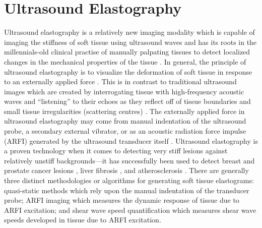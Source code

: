 	\section{Ultrasound Elastography}
		Ultrasound elastography is a relatively new imaging modality which is capable of imaging the stiffness of soft tissue using ultrasound waves \cite{greenleaf03} and has its roots in the millennials-old clinical practise of manually palpating tissues to detect localized changes in the mechanical properties of the tissue \cite{adams02}. In general, the principle of ultrasound elastography is to visualize the deformation of soft tissue in response to an externally applied force \cite{brusseau00}. This is in contrast to traditional ultrasound images which are created by interrogating tissue with high-frequency acoustic waves and ``listening'' to their echoes as they reflect off of tissue boundaries and small tissue irregularities (scattering centres) \cite{hoskins10}. The externally applied force in ultrasound elastography may come from manual indentation of the ultrasound probe, a secondary external vibrator, or as an acoustic radiation force impulse (ARFI) generated by the ultrasound transducer itself \cite{greenleaf03}. Ultrasound elastography is a proven technology when it comes to detecting very stiff lesions against relatively unstiff backgrounds---it has successfully been used to detect breast and prostate cancer lesions \cite{tanter08,konig05}, liver fibrosis \cite{sandrin03,karlas12}, and atherosclerosis \cite{maurice04}. There are generally three distinct methodologies or algorithms for generating soft tissue elastograms: quasi-static methods which rely upon the manual indentation of the transducer probe; ARFI imaging which measures the dynamic response of tissue due to ARFI excitation; and shear wave speed quantification which measures shear wave speeds developed in tissue due to ARFI excitation.


